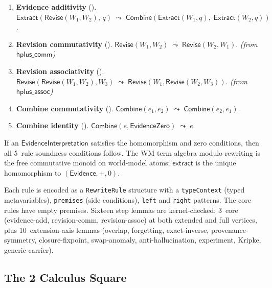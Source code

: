 \documentclass[11pt,openany]{report}
\begin{document}
\begin{enumerate}
\item \textbf{Evidence additivity} (\claimCore{}).
  $\mathsf{Extract}(\mathsf{Revise}(W_1, W_2),\, q) \;\leadsto\;
  \mathsf{Combine}(\mathsf{Extract}(W_1, q),\; \mathsf{Extract}(W_2, q))$.

\item \textbf{Revision commutativity} (\claimCore{}).
  $\mathsf{Revise}(W_1, W_2) \;\leadsto\; \mathsf{Revise}(W_2, W_1)$.
  \emph{(from $\mathsf{hplus\_comm}$)}

\item \textbf{Revision associativity} (\claimCore{}).
  $\mathsf{Revise}(\mathsf{Revise}(W_1, W_2), W_3)
  \;\leadsto\; \mathsf{Revise}(W_1, \mathsf{Revise}(W_2, W_3))$.
  \emph{(from $\mathsf{hplus\_assoc}$)}

\item \textbf{Combine commutativity} (\claimCore{}).
  $\mathsf{Combine}(e_1, e_2) \;\leadsto\; \mathsf{Combine}(e_2, e_1)$.

\item \textbf{Combine identity} (\claimCore{}).
  $\mathsf{Combine}(e, \mathsf{EvidenceZero}) \;\leadsto\; e$.
\end{enumerate}

\begin{theorem}
\label{thm:addcommmonoid}
If an $\mathsf{EvidenceInterpretation}$ satisfies the homomorphism and
zero conditions, then all 5~rule soundness conditions follow.
The WM term algebra modulo rewriting is the free commutative monoid on
world-model atoms; $\mathsf{extract}$ is the unique homomorphism to
$(\mathsf{Evidence}, +, 0)$.
\end{theorem}

Each rule is encoded as a \texttt{RewriteRule} structure with a
\texttt{typeContext} (typed metavariables), \texttt{premises} (side
conditions), \texttt{left} and \texttt{right} patterns.  The core rules
have empty premises.  Sixteen step
lemmas are kernel-checked: 3~core (evidence-add, revision-comm,
revision-assoc) at both extended and full vertices, plus 10~extension-axis
lemmas (overlap, forgetting, exact-inverse, provenance-symmetry,
closure-fixpoint, swap-anomaly, anti-hallucination, experiment,
Kripke, generic carrier).

\subsection{The 2 Calculus Square}
\label{sec:wm-guarded}
\label{sec:wm-context-closure}
\end{document}
